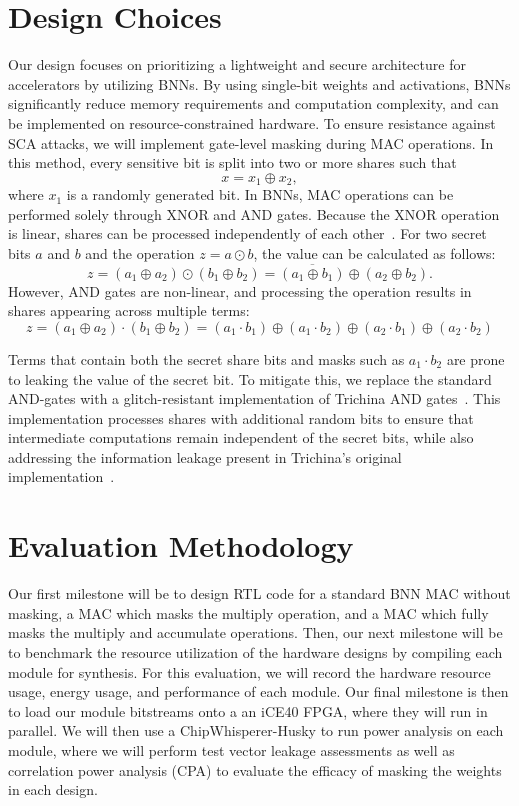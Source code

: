 \documentclass[journal,onecolumn]{IEEEtran}
\begin{document}
\section{Design Choices}
Our design focuses on prioritizing a lightweight and secure architecture for accelerators by utilizing BNNs. 
By using single-bit weights and activations, BNNs significantly reduce memory requirements and computation complexity, 
and can be implemented on resource-constrained hardware. To ensure resistance against SCA attacks, we will implement 
gate-level masking during MAC operations. In this method, every sensitive bit is split into two or more shares such that 
$$x = x_1 \oplus x_2,$$
where $x_1$ is a randomly generated bit. In BNNs, MAC operations can be performed solely through XNOR and AND gates. 
Because the XNOR operation is linear, shares can be processed independently of each other~\cite{trichinaSmallSizeLow2005}. For two secret bits $a$ and $b$
and the operation $z = a \odot b$, the value can be calculated as follows: 
$$z=(a_1 \oplus a_2)\odot(b_1 \oplus b_2) = \overline{(a_1 \oplus b_1)} \oplus (a_2 \oplus b_2).$$
However, AND gates are non-linear, and processing the operation results in shares appearing across multiple terms:
$$z=(a_1 \oplus a_2)\cdot(b_1 \oplus b_2) = (a_1 \cdot b_1) \oplus (a_1 \cdot b_2) \oplus (a_2 \cdot b_1) \oplus (a_2 \cdot b_2)$$

Terms that contain both the secret share bits and masks such as $a_1 \cdot b_2$ are prone to leaking the value of the secret bit. 
To mitigate this, we replace the standard AND-gates with a glitch-resistant implementation of Trichina AND gates~\cite{dubeyBoMaNetBooleanMasking2020}. This implementation 
processes shares with additional random bits to ensure that intermediate computations remain independent of the secret bits, while also
addressing the information leakage present in Trichina's original implementation~\cite{nikovaThresholdImplementationsSideChannel2006}. 

\section{Evaluation Methodology}
Our first milestone will be to design RTL code for a standard BNN MAC without masking, a MAC which masks the multiply operation, 
and a MAC which fully masks the multiply and accumulate operations. Then, our next milestone will be to benchmark the resource utilization
of the hardware designs by compiling each module for synthesis. For this evaluation, we will record the hardware resource usage, energy usage,
and performance of each module. Our final milestone is then to load our module bitstreams onto a an iCE40 FPGA, where they will run in parallel.
We will then use a ChipWhisperer-Husky to run power analysis on each module, where we will perform test vector leakage assessments as well 
as correlation power analysis (CPA) to evaluate the efficacy of masking the weights in each design.



\end{document}
